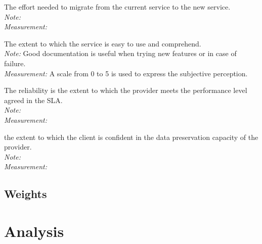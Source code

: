 \documentclass[a4paper,11pt]{article}
\begin{document}
\begin{description}[parsep=1pt,listparindent=\parindent,labelindent=\parindent,font=$\bullet$\ ]
  \item[Migration:] The effort needed to migrate from the current service to the new service.\\
    \emph{Note:} \\
    \emph{Measurement:} 

  \item[Usability:] The extent to which the service is easy to use and comprehend.\\
    \emph{Note:} Good documentation is useful when trying new features or in case of failure.\\
    \emph{Measurement:} A scale from 0 to 5 is used to express the subjective perception.

  \item[Reliability:] The reliability is the extent to which the provider meets the performance level agreed in the SLA.\\
    \emph{Note:} \\
    \emph{Measurement:} 

  \item[Security backup:] the extent to which the client is confident in the data preservation capacity of the provider.\\
    \emph{Note:} \\
    \emph{Measurement:} 

\end{description}


\subsection{Weights}


\section{Analysis}
\end{document}
